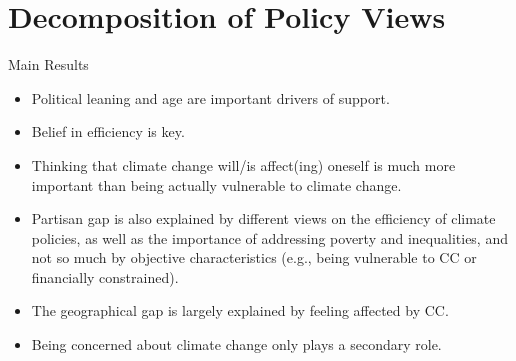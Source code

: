 \begin{frame}{}%
\begin{table}[h!]
\begin{center}
\scalebox{.46}{}
\end{center}
\end{table}
\end{frame}

\begin{frame}{}%
\begin{table}[h!]
\begin{center}
\scalebox{.45}{}
\end{center}
\end{table}
\end{frame}

\section{Decomposition of Policy Views}


\begin{frame}{Main Results}
\begin{itemize}
	\item Political leaning and age are important drivers of support. \newline
	\item Belief in efficiency is key.
	\item Thinking that climate change will/is affect(ing) oneself is much more important than being actually vulnerable to climate change. \newline
	\item Partisan gap is also explained by different views on the efficiency of climate policies, as well as the importance of addressing poverty and inequalities, and not so much by objective characteristics (e.g., being vulnerable to CC or financially constrained).
	\item The geographical gap is largely explained by feeling affected by CC.
	\item Being concerned about climate change only plays a secondary role.
\end{itemize}
\end{frame}



